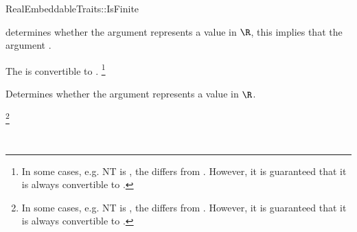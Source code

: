 \begin{ccRefConcept}{RealEmbeddableTraits::IsFinite}

\ccDefinition

 determines whether the argument represents 
a value in $\R$, this implies that the argument .

\ccRefines 


\ccTypes
{}
{}
{The  is convertible to . 
 \footnote{In some cases, e.g. NT is , the 
  differs from . 
 However, it is guaranteed that it is always convertible to .}
}\ccGlue
{}

\ccOperations
{}
        { Determines whether the argument represents a value in $\R$. }


\footnote{In some cases, e.g. NT is , the 
  differs from . 
 However, it is guaranteed that it is always convertible to .}

\ccSeeAlso

\\

\end{ccRefConcept} 

